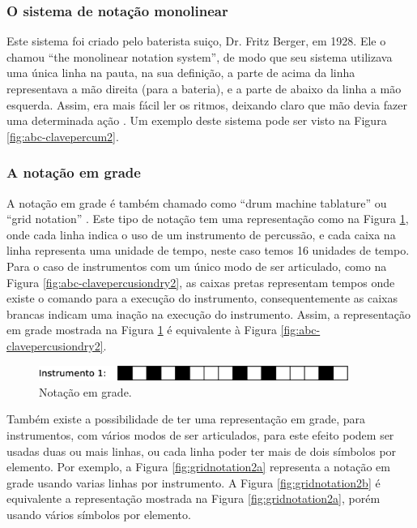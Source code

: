 \subsubsection{O sistema de notação monolinear}
Este sistema foi criado pelo baterista suiço, Dr. Fritz Berger, em 1928. 
Ele o chamou ``the monolinear notation system'', 
de modo que seu sistema utilizava uma única linha na pauta, na sua definição,
a parte de acima da linha representava a mão direita (para a bateria), e
a parte de abaixo da linha a mão esquerda.
Assim, era mais fácil ler os ritmos, deixando claro que mão devia fazer uma determinada ação
\cite[pp. 148]{beck1995encyclopedia} \cite[pp. 332]{dean2012drum}.
Um exemplo deste sistema pode ser visto na Figura \ref{fig:abc-clavepercum2}.

\subsubsection{A notação em grade}
A notação em grade é também chamado como ``drum machine tablature'' \cite{badness1991drum} ou
``grid notation'' \cite{bardet1985200}. Este tipo de notação tem uma representação como na Figura \ref{fig:gridnotation1},
onde cada linha indica o uso de um instrumento de percussão, 
e cada caixa na linha representa uma unidade de tempo, neste caso temos 16 unidades de tempo.
Para o caso de instrumentos com um único modo de ser articulado, como na Figura \ref{fig:abc-clavepercusiondry2},
as caixas pretas representam tempos onde existe o comando para a execução do instrumento,
consequentemente as caixas brancas indicam uma inação na execução do instrumento.
Assim, a representação em grade mostrada na Figura \ref{fig:gridnotation1} 
é equivalente à Figura \ref{fig:abc-clavepercusiondry2}.
\begin{figure}[h]
    \centering 
\includegraphics[width=0.9\textwidth]{chapters/cap-musica-basica/gridnotation.eps}
    \caption{Notação em grade.}\label{fig:gridnotation1}
\end{figure}

Também existe a possibilidade de ter uma representação em grade, para instrumentos, 
com vários modos de ser articulados, para este efeito podem ser usadas duas ou mais linhas,
ou cada linha poder ter mais de dois símbolos por elemento.
Por exemplo, a Figura \ref{fig:gridnotation2a} representa a notação em grade usando
varias linhas por instrumento. A Figura \ref{fig:gridnotation2b} é equivalente 
a representação mostrada na Figura \ref{fig:gridnotation2a}, porém usando vários símbolos por elemento.

